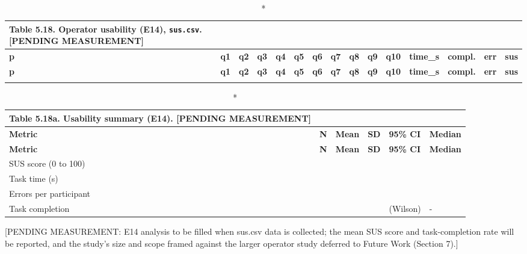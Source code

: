 \begin{center}
\tiny
\begin{longtable}{|l|l|l|l|l|l|l|l|l|l|l|l|l|l|l|}
\caption*{Table 5.18. Operator usability (E14), \texttt{sus.csv}. [PENDING MEASUREMENT]}
\addcontentsline{lot}{table}{\protect\numberline{5.18}Operator usability (E14), \texttt{sus.csv}. [PENDING MEASUREMENT]}
\\
\hline
\textbf{p} & \textbf{q1} & \textbf{q2} & \textbf{q3} & \textbf{q4} & \textbf{q5} & \textbf{q6} & \textbf{q7} & \textbf{q8} & \textbf{q9} & \textbf{q10} & \textbf{time\_s} & \textbf{compl.} & \textbf{err} & \textbf{sus} \\
\hline
\endfirsthead
\hline
\textbf{p} & \textbf{q1} & \textbf{q2} & \textbf{q3} & \textbf{q4} & \textbf{q5} & \textbf{q6} & \textbf{q7} & \textbf{q8} & \textbf{q9} & \textbf{q10} & \textbf{time\_s} & \textbf{compl.} & \textbf{err} & \textbf{sus} \\
\hline
\endhead
 & & & & & & & & & & & & & & \\
\hline
\end{longtable}
\end{center}

\begin{center}
\begin{longtable}{|p{4.5cm}|l|l|l|l|l|}
\caption*{Table 5.18a. Usability summary (E14). [PENDING MEASUREMENT]}
\addcontentsline{lot}{table}{\protect\numberline{5.18a}Usability summary (E14). [PENDING MEASUREMENT]}
\\
\hline
\textbf{Metric} & \textbf{N} & \textbf{Mean} & \textbf{SD} & \textbf{95\% CI} & \textbf{Median} \\
\hline
\endfirsthead
\hline
\textbf{Metric} & \textbf{N} & \textbf{Mean} & \textbf{SD} & \textbf{95\% CI} & \textbf{Median} \\
\hline
\endhead
SUS score (0 to 100) & & & & & \\
\hline
Task time (s) & & & & & \\
\hline
Errors per participant & & & & & \\
\hline
Task completion & & & & (Wilson) & - \\
\hline
\end{longtable}
\end{center}

[PENDING MEASUREMENT: E14 analysis to be filled when sus.csv data is collected; the mean SUS score and task-completion rate will be reported, and the study's size and scope framed against the larger operator study deferred to Future Work (Section 7).]

